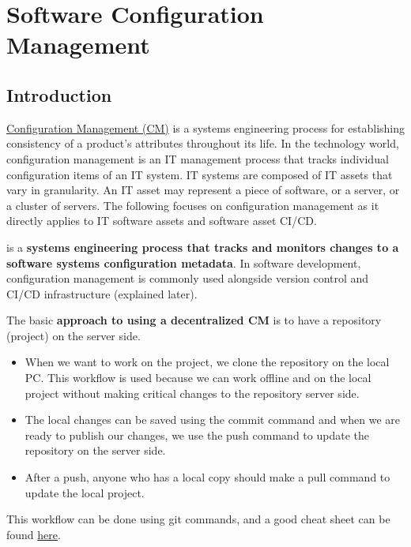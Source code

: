 \section{Software Configuration Management}

\subsection{Introduction}

\href{https://www.atlassian.com/microservices/microservices-architecture/configuration-management}{Configuration Management (CM)} is a systems engineering process for establishing consistency of a product's attributes throughout its life. In the technology world, configuration management is an IT management process that tracks individual configuration items of an IT system. IT systems are composed of IT assets that vary in granularity. An IT asset may represent a piece of software, or a server, or a cluster of servers. The following focuses on configuration management as it directly applies to IT software assets and software asset CI/CD.

\highspace
{} is a \textbf{systems engineering process that tracks and monitors changes to a software systems configuration metadata}. In software development, configuration management is commonly used alongside version control and CI/CD infrastructure (explained later).

\highspace
The basic \textbf{approach to using a decentralized CM} is to have a repository (project) on the server side. 
\begin{itemize}
    \item When we want to work on the project, we clone the repository on the local PC. This workflow is used because we can work offline and on the local project without making critical changes to the repository server side.
    
    \item The local changes can be saved using the commit command and when we are ready to publish our changes, we use the push command to update the repository on the server side.
    
    \item After a push, anyone who has a local copy should make a pull command to update the local project.
\end{itemize}
This workflow can be done using git commands, and a good cheat sheet can be found \href{https://education.github.com/git-cheat-sheet-education.pdf}{here}.